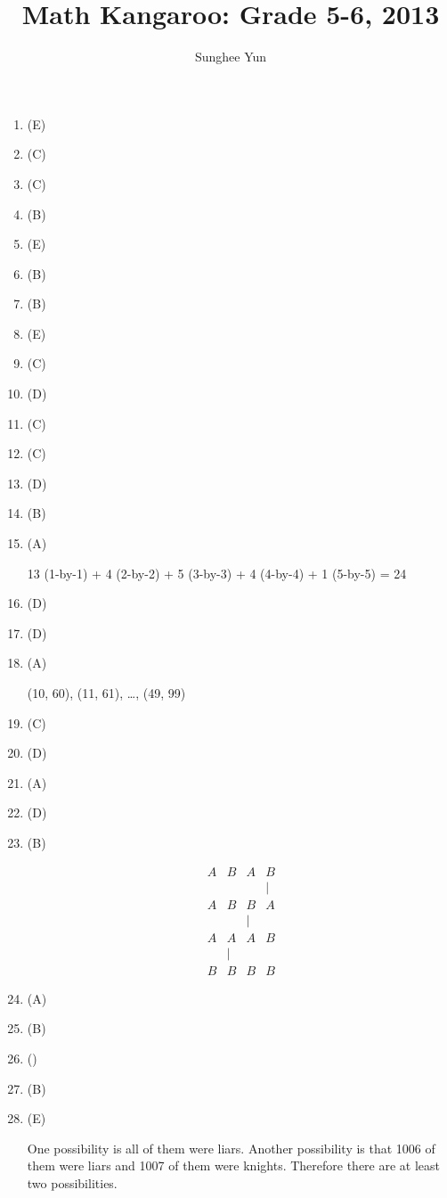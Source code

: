 \documentclass{article}
\title{Math Kangaroo: Grade 5-6, 2013}
\author{Sunghee Yun}
\begin{document}
\maketitle

\begin{enumerate}
\item (E)
\item (C)
\item (C)
\item (B)
\item (E)
\item (B)
\item (B)
\item (E)
\item (C)
\item (D)
\item (C)
\item (C)
\item (D)
\item (B)
\item (A)
\begin{solution}
13 (1-by-1)
+ 4 (2-by-2)
+ 5 (3-by-3)
+ 4 (4-by-4)
+ 1 (5-by-5)
= 24
\end{solution}
\item (D)
\item (D)
\item (A)
\begin{solution}
(10, 60), (11, 61), \ldots, (49, 99)
\end{solution}
\item (C)
\item (D)
\item (A)
\item (D)
\item (B)
\begin{solution}
\[
\begin{array}{cccc}
A&B&A&B
\\
 & & &|
\\
A&B&B&A
\\
 & &|
\\
A&A&A&B
\\
& |
\\
B&B&B&B
\end{array}
\]
\end{solution}

\item (A)
\item (B)
\item ()
\item (B)

\item (E)
\begin{solution}
One possibility is all of them were liars.
Another possibility is that 1006 of them were liars and 1007 of them were knights.
Therefore there are at least two possibilities.
\end{solution}


\end{enumerate}
\end{document}
